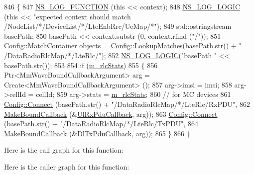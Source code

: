 \begin{DoxyCode}
846 \{
847   \hyperlink{log-macros-disabled_8h_a90b90d5bad1f39cb1b64923ea94c0761}{NS\_LOG\_FUNCTION} (\textcolor{keyword}{this} << context);
848   \hyperlink{group__logging_ga88acd260151caf2db9c0fc84997f45ce}{NS\_LOG\_LOGIC} (\textcolor{keyword}{this} << \textcolor{stringliteral}{"expected context should match
       /NodeList/*/DeviceList/*/LteEnbRrc/UeMap/*"});
849   std::ostringstream basePath;
850   basePath <<  context.substr (0, context.rfind (\textcolor{stringliteral}{"/"}));
851   Config::MatchContainer objects = \hyperlink{group__config_ga74aeb63f8f50b4a98043351552ef7db6}{Config::LookupMatches}(basePath.str() + \textcolor{stringliteral}{"
      /DataRadioRlcMap/*/LteRlc/"});
852   \hyperlink{group__logging_ga88acd260151caf2db9c0fc84997f45ce}{NS\_LOG\_LOGIC}(\textcolor{stringliteral}{"basePath "} << basePath.str());
853 
854   \textcolor{keywordflow}{if} (\hyperlink{classns3_1_1MmWaveBearerStatsConnector_a3613ebbbe92cd828e66b03c91c7ebcbb}{m\_rlcStats})
855     \{
856       Ptr<MmWaveBoundCallbackArgument> arg = Create<MmWaveBoundCallbackArgument> ();
857       arg->imsi = imsi;
858       arg->cellId = cellId; 
859       arg->stats = \hyperlink{classns3_1_1MmWaveBearerStatsConnector_a3613ebbbe92cd828e66b03c91c7ebcbb}{m\_rlcStats};
860       \textcolor{comment}{// for MC devices}
861       \hyperlink{group__config_ga4014f151241cd0939b6cb64409605736}{Config::Connect} (basePath.str() + \textcolor{stringliteral}{"/DataRadioRlcMap/*/LteRlc/RxPDU"},
862            \hyperlink{group__makeboundcallback_ga1725d6362e6065faa0709f7c93f8d770}{MakeBoundCallback} (&\hyperlink{namespacens3_a269527c03607c9c885d7cff7667ec5e0}{UlRxPduCallback}, arg));
863       \hyperlink{group__config_ga4014f151241cd0939b6cb64409605736}{Config::Connect} (basePath.str() + \textcolor{stringliteral}{"/DataRadioRlcMap/*/LteRlc/TxPDU"},
864            \hyperlink{group__makeboundcallback_ga1725d6362e6065faa0709f7c93f8d770}{MakeBoundCallback} (&\hyperlink{namespacens3_a7de82f7ed9986b9bcb67951f61e02ff4}{DlTxPduCallback}, arg));
865     \}
866 \}
\end{DoxyCode}


Here is the call graph for this function\+:




Here is the caller graph for this function\+:



